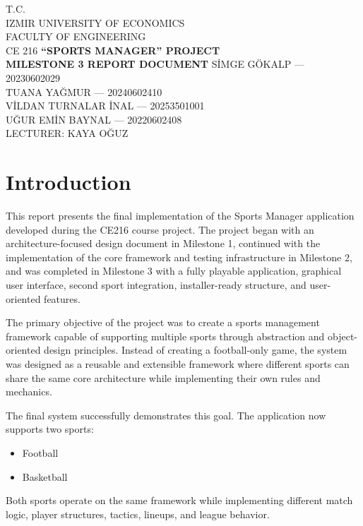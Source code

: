 \documentclass[11pt,a4paper]{article}
\begin{document}
\begin{titlepage}
\thispagestyle{empty}
\centering
\vspace*{2cm}
T.C.\\
IZMIR UNIVERSITY OF ECONOMICS\\
FACULTY OF ENGINEERING\\
CE 216
\vfill
{\Large\bfseries ``SPORTS MANAGER'' PROJECT}\\[0.75em]
{\large\bfseries MILESTONE 3 REPORT DOCUMENT}
\vfill
SİMGE GÖKALP — 20230602029\\[0.45em]
TUANA YAĞMUR — 20240602410\\[0.45em]
VİLDAN TURNALAR İNAL — 20253501001\\[0.45em]
UĞUR EMİN BAYNAL — 20220602408\\[1.25em]
LECTURER: KAYA OĞUZ
\end{titlepage}

\section{Introduction}

This report presents the final implementation of the Sports Manager application developed during the CE216 course project. The project began with an architecture-focused design document in Milestone 1, continued with the implementation of the core framework and testing infrastructure in Milestone 2, and was completed in Milestone 3 with a fully playable application, graphical user interface, second sport integration, installer-ready structure, and user-oriented features.

The primary objective of the project was to create a sports management framework capable of supporting multiple sports through abstraction and object-oriented design principles. Instead of creating a football-only game, the system was designed as a reusable and extensible framework where different sports can share the same core architecture while implementing their own rules and mechanics.

The final system successfully demonstrates this goal. The application now supports two sports:
\begin{itemize}
\item Football
\item Basketball
\end{itemize}
Both sports operate on the same framework while implementing different match logic, player structures, tactics, lineups, and league behavior.
\end{document}
